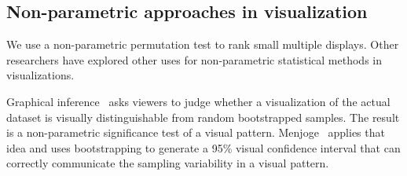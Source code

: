 \subsection{Non-parametric approaches in visualization}
We use a non-parametric permutation test to rank small multiple displays. Other researchers have explored other uses for non-parametric statistical methods in visualizations.

Graphical inference~\cite{Buja2009, Wickham2013, Majumder2013} asks viewers to judge whether a visualization of the actual dataset is visually distinguishable from random bootstrapped samples. The result is a non-parametric significance test of a visual pattern. Menjoge~\cite{Menjoge2010} applies that idea and uses bootstrapping to generate a 95\% visual confidence interval that can correctly communicate the sampling variability in a visual pattern. 

